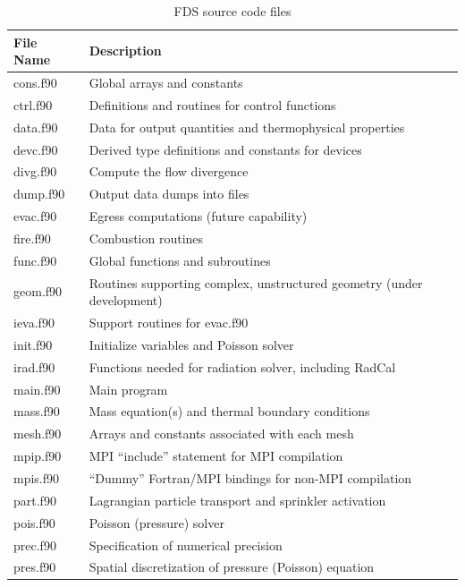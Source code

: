\documentclass[11pt]{book}
\begin{document}
\begin{table}[ht]
\begin{center}
\caption{FDS source code files}
\label{tab:sourcefiles}
\vspace{.1in}
\begin{tabular}{|l|l|}
\hline
File Name  & Description  \\ \hline \hline
cons.f90   & Global arrays and constants \\ \hline
ctrl.f90   & Definitions and routines for control functions \\ \hline
data.f90   & Data for output quantities and thermophysical properties\\ \hline
devc.f90   & Derived type definitions and constants for devices \\ \hline
divg.f90   & Compute the flow divergence \\ \hline
dump.f90   & Output data dumps into files \\ \hline
evac.f90   & Egress computations (future capability) \\ \hline
fire.f90   & Combustion routines \\ \hline
func.f90   & Global functions and subroutines \\ \hline
geom.f90   & Routines supporting complex, unstructured geometry (under development) \\ \hline
ieva.f90   & Support routines for evac.f90 \\ \hline
init.f90   & Initialize variables and Poisson solver \\ \hline
irad.f90   & Functions needed for radiation solver, including RadCal \\ \hline
main.f90   & Main program \\ \hline
mass.f90   & Mass equation(s) and thermal boundary conditions \\ \hline
mesh.f90   & Arrays and constants associated with each mesh \\ \hline
mpip.f90   & MPI ``include'' statement for MPI compilation \\ \hline
mpis.f90   & ``Dummy'' Fortran/MPI bindings for non-MPI compilation \\ \hline
part.f90   & Lagrangian particle transport and sprinkler activation \\ \hline
pois.f90   & Poisson (pressure) solver \\ \hline
prec.f90   & Specification of numerical precision \\ \hline
pres.f90   & Spatial discretization of pressure (Poisson) equation \\ \hline

\end{tabular}
\end{center}
\end{table}
\end{document}
